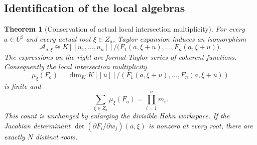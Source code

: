 \documentclass[11pt,oneside]{article}
\numberwithin{equation}{section}
\newtheorem{theorem}{Theorem}[section]
\theoremstyle{definition}
\theoremstyle{remark}\newtheorem{remark}[theorem]{Remark}
\newcommand{\sh}{^{\sharp}}
\begin{document}
\subsection{Identification of the local algebras}
\begin{theorem}[Conservation of actual local intersection multiplicity]\label{thm:fiberlength}
For every \(a\in U\sh\) and every actual root \(\xi\in Z_a\), Taylor expansion induces an isomorphism
\begin{equation}\label{eq:localidentification}
 \mathcal A_{a,\xi}\cong
 K[[u_1,\ldots,u_n]]/
 \bigl(F_1(a,\xi+u),\ldots,F_n(a,\xi+u)\bigr).
\end{equation}
The expressions on the right are formal Taylor series of coherent functions. Consequently the local intersection multiplicity
\[
 \mu_\xi(F_a)=
 \dim_K K[[u]]/(F_1(a,\xi+u),\ldots,F_n(a,\xi+u))
\]
is finite and
\begin{equation}\label{eq:conservation}
 \boxed{\displaystyle\sum_{\xi\in Z_a}\mu_\xi(F_a)
 =\prod_{i=1}^n m_i.}
\end{equation}
This count is unchanged by enlarging the divisible Hahn workspace. If the Jacobian determinant \(\det(\partial F_i/\partial w_j)(a,\xi)\) is nonzero at every root, there are exactly \(N\) distinct roots.
\end{theorem}
\end{document}
